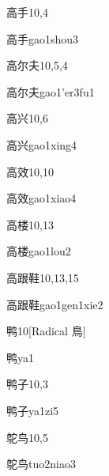 \begin{entry}{高手}{10,4}
  \begin{phonetics}{高手}{gao1shou3}
  \end{phonetics}
\end{entry}

\begin{entry}{高尔夫}{10,5,4}
  \begin{phonetics}{高尔夫}{gao1'er3fu1}
  \end{phonetics}
\end{entry}

\begin{entry}{高兴}{10,6}
  \begin{phonetics}{高兴}{gao1xing4}
  \end{phonetics}
\end{entry}

\begin{entry}{高效}{10,10}
  \begin{phonetics}{高效}{gao1xiao4}
  \end{phonetics}
\end{entry}

\begin{entry}{高楼}{10,13}
  \begin{phonetics}{高楼}{gao1lou2}
  \end{phonetics}
\end{entry}

\begin{entry}{高跟鞋}{10,13,15}
  \begin{phonetics}{高跟鞋}{gao1gen1xie2}
  \end{phonetics}
\end{entry}

\begin{entry}{鸭}{10}[Radical 鳥]
  \begin{phonetics}{鸭}{ya1}
  \end{phonetics}
\end{entry}

\begin{entry}{鸭子}{10,3}
  \begin{phonetics}{鸭子}{ya1zi5}
  \end{phonetics}
\end{entry}

\begin{entry}{鸵鸟}{10,5}
  \begin{phonetics}{鸵鸟}{tuo2niao3}
  \end{phonetics}
\end{entry}


